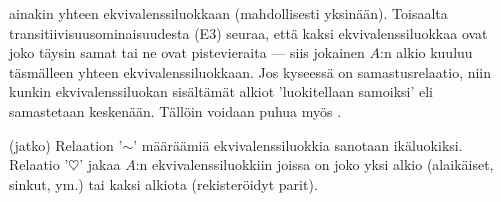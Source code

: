 ainakin yhteen ekvivalenssiluokkaan (mahdollisesti yksinään). Toisaalta 
transitiivisuusominaisuudesta (E3) seuraa, että kaksi ekvivalenssiluokkaa ovat joko täysin samat
tai ne ovat pistevieraita --- siis jokainen $A$:n alkio kuuluu täsmälleen yhteen
ekvivalenssiluokkaan. Jos kyseessä on samastusrelaatio, niin kunkin ekvivalenssiluokan 
sisältämät alkiot 'luokitellaan samoiksi' eli samastetaan keskenään. Tällöin voidaan puhua myös
%
. 
\jatko \begin{Exa} (jatko) Relaation '$\sim$' määräämiä ekvivalenssiluokkia sanotaan 
ikäluokiksi. Relaatio '$\heartsuit$' jakaa $A$:n ekvivalenssiluokkiin joissa on joko yksi alkio
(alaikäiset, sinkut, ym.) tai kaksi alkiota (rekisteröidyt parit). \loppu 
\end{Exa}

